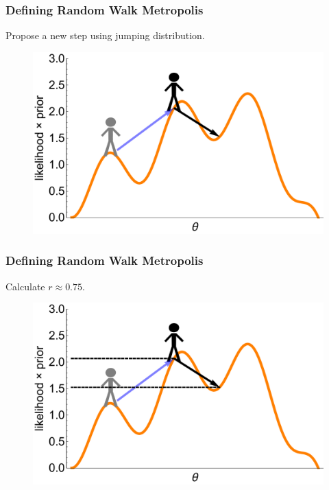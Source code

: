 \documentclass[handout]{beamer}
\begin{document}
\begin{frame}
\frametitle{Defining Random Walk Metropolis}
Propose a new step using jumping distribution.

\begin{figure}[ht]
\centerline{\includegraphics[width=1\textwidth]{./Figures/lec4_metropolisDefinition10.pdf}}
\end{figure}

\end{frame}

\begin{frame}
\frametitle{Defining Random Walk Metropolis}
Calculate $r\approx 0.75$.

\begin{figure}[ht]
\centerline{\includegraphics[width=1\textwidth]{./Figures/lec4_metropolisDefinition11.pdf}}
\end{figure}

\end{frame}
\end{document}
